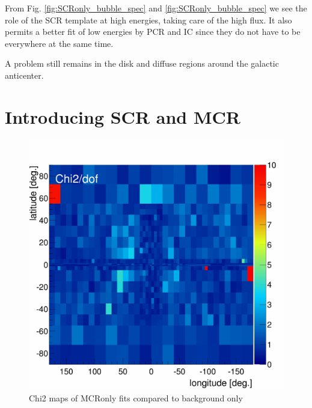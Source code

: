 From Fig. \ref{fig:SCRonly_bubble_spec} and \ref{fig:SCRonly_bubble_spec} we see the role of the SCR template at high energies, taking care of the high flux. It also permits a better fit of low energies by PCR and IC since they do not have to be everywhere at the same time.

A problem still remains in the disk and diffuse regions around the galactic anticenter. 



\section{Introducing SCR and MCR}

\begin{figure}[h]
  \centering
  \includegraphics[width=.9\linewidth]{pic/results/MCRonly_chi2Distribution.png}
  \caption{Chi2 maps of MCRonly fits compared to background only}
  \label{fig:MCRonly_chi2Distribution}
\end{figure}

